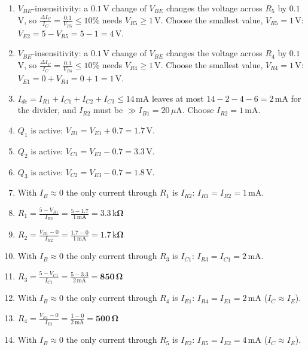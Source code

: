 \documentclass[11pt]{article}
\newcommand{\solstep}[2]{\par\medskip{\color{stepc}\textbf{Step #1 --- #2}}\par\nopagebreak}
\begin{document}
\solstep{2}{Design, node by node}\begin{enumerate}[leftmargin=*,itemsep=3pt]
\item $V_{BE}$-insensitivity: a $0.1$\,V change of $V_{BE}$ changes the voltage across $R_{5}$ by $0.1$\,V, so $\frac{\Delta I_C}{I_C} = \frac{0.1}{V_{R5}} \le 10\%$ needs $V_{R5} \ge 1$\,V. Choose the smallest value, $V_{R5} = 1$\,V: $V_{E2} = 5 - V_{R5} = 5 - 1 = 4\,\mathrm{V}$.
\item $V_{BE}$-insensitivity: a $0.1$\,V change of $V_{BE}$ changes the voltage across $R_{4}$ by $0.1$\,V, so $\frac{\Delta I_C}{I_C} = \frac{0.1}{V_{R4}} \le 10\%$ needs $V_{R4} \ge 1$\,V. Choose the smallest value, $V_{R4} = 1$\,V: $V_{E1} = 0 + V_{R4} = 0 + 1 = 1\,\mathrm{V}$.
\item $I_{dc} = I_{R1} + I_{C1} + I_{C2} + I_{C3} \le 14\,\mathrm{mA}$ leaves at most $14 - 2 - 4 - 6 = 2\,\mathrm{mA}$ for the divider, and $I_{R2}$ must be $\gg I_{B1} = 20\,\mu\mathrm{A}$. Choose $I_{R2} = 1\,\mathrm{mA}$.
\item $Q_{1}$ is active: $V_{B1} = V_{E1} + 0.7 = 1.7\,\mathrm{V}$.
\item $Q_{2}$ is active: $V_{C1} = V_{E2} - 0.7 = 3.3\,\mathrm{V}$.
\item $Q_{3}$ is active: $V_{C2} = V_{E3} - 0.7 = 1.8\,\mathrm{V}$.
\item With $I_B\approx0$ the only current through $R_{1}$ is $I_{R2}$: $I_{R1} = I_{R2} = 1\,\mathrm{m}\mathrm{A}$.
\item $\displaystyle R_{1} = \frac{5 - V_{B1}}{I_{R2}} = \frac{5 - 1.7}{1\,\mathrm{m}\mathrm{A}} = \mathbf{3.3\,\mathrm{k}\Omega}$
\item $\displaystyle R_{2} = \frac{V_{B1} - 0}{I_{R2}} = \frac{1.7 - 0}{1\,\mathrm{m}\mathrm{A}} = \mathbf{1.7\,\mathrm{k}\Omega}$
\item With $I_B\approx0$ the only current through $R_{3}$ is $I_{C1}$: $I_{R3} = I_{C1} = 2\,\mathrm{m}\mathrm{A}$.
\item $\displaystyle R_{3} = \frac{5 - V_{C1}}{I_{C1}} = \frac{5 - 3.3}{2\,\mathrm{m}\mathrm{A}} = \mathbf{850\,\Omega}$
\item With $I_B\approx0$ the only current through $R_{4}$ is $I_{E1}$: $I_{R4} = I_{E1} = 2\,\mathrm{m}\mathrm{A}$ ($I_C\approx I_E$).
\item $\displaystyle R_{4} = \frac{V_{E1} - 0}{I_{E1}} = \frac{1 - 0}{2\,\mathrm{m}\mathrm{A}} = \mathbf{500\,\Omega}$
\item With $I_B\approx0$ the only current through $R_{5}$ is $I_{E2}$: $I_{R5} = I_{E2} = 4\,\mathrm{m}\mathrm{A}$ ($I_C\approx I_E$).

\end{enumerate}
\end{document}
